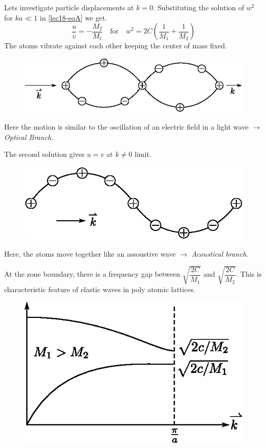 Lets investigate particle displacements at $k=0$. Substituting the solution of $w^{2}$ for $ka\ll 1$ in \eqref{lec18-eqA} we get.
$$
\dfrac{u}{v}=-\dfrac{M_{2}}{M_{1}}\quad \text{for}\quad w^{2}=2C\left(\frac{1}{M_{1}}+\dfrac{1}{M_{2}}\right)
$$
The atoms vibrate against each other keeping the center of mass fixed.
\begin{figure}[H]
\centering
\includegraphics{images/lecture18/fig3.eps}
\end{figure}

Here the motion is similar to the oscillation of an electric field in a light wave $\to$ {\em Optical Branch}.

The second solution gives $u=v$ at $k\neq 0$ limit.
\begin{figure}[H]
\centering
\includegraphics{images/lecture18/fig4.eps}
\end{figure}

Here, the atoms move together like an assoustive wave $\to$ {\em Acoustical branch}.

At the zone boundary, there is a frequency gap between $\sqrt{\dfrac{2C}{M_{1}}}$ and $\sqrt{\dfrac{2C}{M_{2}}}$. This is characteristic feature of elastic waves in poly atomic lattices.
\begin{figure}[H]
\centering
\includegraphics{images/lecture18/fig5.eps}
\end{figure}

